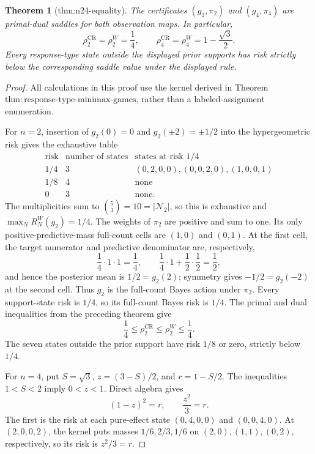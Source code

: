 \documentclass{article}
\newtheorem{theorem}{Theorem}
\begin{document}
\begin{theorem}[thm:n24-equality]\label{thm:n24-equality}
The certificates \((g_2,\pi_2)\) and \((g_4,\pi_4)\) are primal-dual saddles for both observation maps. In particular, \[\rho_2^{\mathrm{CR}}=\rho_2^W=\frac14,\qquad \rho_4^{\mathrm{CR}}=\rho_4^W=1-\frac{\sqrt3}{2}.\] Every response-type state outside the displayed prior supports has risk strictly below the corresponding saddle value under the displayed rule.
\end{theorem}
\begin{proof}
All calculations in this proof use the kernel derived in Theorem \(\mathrm{thm{:}response\mbox{-}type\mbox{-}minimax\mbox{-}games}\), rather than a labeled-assignment enumeration.

For \(n=2\), insertion of \(g_2(0)=0\) and \(g_2(\pm2)=\pm1/2\) into the hypergeometric risk gives the exhaustive table
\[
\begin{array}{c|c|c}
\text{risk}&\text{number of states}&\text{states at risk }1/4\\ \hline
1/4&3&(0,2,0,0),(0,0,2,0),(1,0,0,1)\\
1/8&4&\text{none}\\
0&3&\text{none}.
\end{array}
\]
The multiplicities sum to \(\binom{5}{3}=10=|\mathcal N_2|\), so this is exhaustive and \(\max_NR_N^W(g_2)=1/4\).  The weights of \(\pi_2\) are positive and sum to one.  Its only positive-predictive-mass full-count cells are \((1,0)\) and \((0,1)\).  At the first cell, the target numerator and predictive denominator are, respectively,
\[
 \frac14\cdot1\cdot1=\frac14,
 \qquad
 \frac14\cdot1+\frac12\cdot\frac12=\frac12,
\]
and hence the posterior mean is \(1/2=g_2(2)\); symmetry gives \(-1/2=g_2(-2)\) at the second cell.  Thus \(g_2\) is the full-count Bayes action under \(\pi_2\).  Every support-state risk is \(1/4\), so its full-count Bayes risk is \(1/4\).  The primal and dual inequalities from the preceding theorem give
\[
 \frac14\leq\rho_2^{\mathrm{CR}}\leq\rho_2^W\leq\frac14.
\]
The seven states outside the prior support have risk \(1/8\) or zero, strictly below \(1/4\).

For \(n=4\), put \(S=\sqrt3\), \(z=(3-S)/2\), and \(r=1-S/2\).  The inequalities \(1<S<2\) imply \(0<z<1\).  Direct algebra gives
\[
 (1-z)^2=r,\qquad \frac{z^2}{3}=r.
\]
The first is the risk at each pure-effect state \((0,4,0,0)\) and \((0,0,4,0)\).  At \((2,0,0,2)\), the kernel puts masses \(1/6,2/3,1/6\) on \((2,0),(1,1),(0,2)\), respectively, so its risk is \(z^2/3=r\).


\end{proof}
\end{document}
